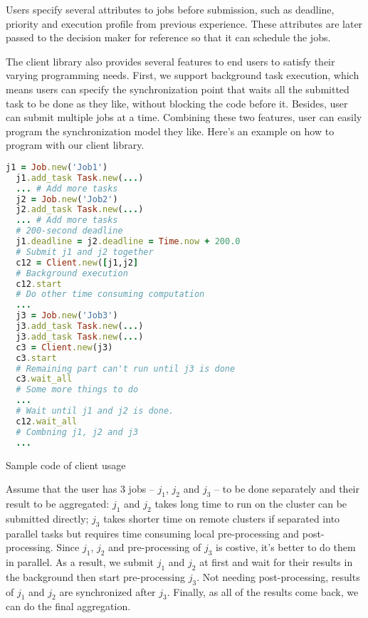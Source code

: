 Users specify several attributes to jobs before submission, such as
deadline, priority and execution profile from previous experience.
These attributes are later passed to the decision maker for reference so
that it can schedule the jobs.

The client library also provides several features to end users to
satisfy their varying programming needs.  First, we support background
task execution, which means users can specify the synchronization point
that waits all the submitted task to be done as they like, without
blocking the code before it.  Besides, user can submit multiple jobs at
a time.  Combining these two features, user can easily program the
synchronization model they like.  Here's an example on how to program
with our client library.

\begin{Code}

  \begin{lstlisting}[language=Ruby]
  j1 = Job.new('Job1')
  j1.add_task Task.new(...)
  ... # Add more tasks
  j2 = Job.new('Job2')
  j2.add_task Task.new(...)
  ... # Add more tasks
  # 200-second deadline
  j1.deadline = j2.deadline = Time.now + 200.0
  # Submit j1 and j2 together
  c12 = Client.new([j1,j2]
  # Background execution
  c12.start
  # Do other time consuming computation
  ...
  j3 = Job.new('Job3')
  j3.add_task Task.new(...)
  j3.add_task Task.new(...)
  c3 = Client.new(j3)
  c3.start
  # Remaining part can't run until j3 is done
  c3.wait_all
  # Some more things to do
  ...
  # Wait until j1 and j2 is done.
  c12.wait_all
  # Combning j1, j2 and j3
  ...

  \end{lstlisting}
  \caption{Sample code of client usage}
\end{Code}

Assume that the user has 3 jobs -- $j_1$, $j_2$ and $j_3$ -- to be done
separately and their result to be aggregated:  $j_1$ and $j_2$ takes
long time to run on the cluster can be submitted directly; $j_3$ takes
shorter time on remote clusters if separated into parallel tasks but
requires time consuming local pre-processing and post-processing.  Since
$j_1$, $j_2$ and pre-processing of $j_3$ is costive, it's better to do
them in parallel.  As a result, we submit $j_1$ and $j_2$ at first and
wait for their results in the background then start pre-processing
$j_3$. Not needing post-processing, results of $j_1$ and $j_2$ are
synchronized after $j_3$.  Finally, as all of the results come back, we
can do the final aggregation.

